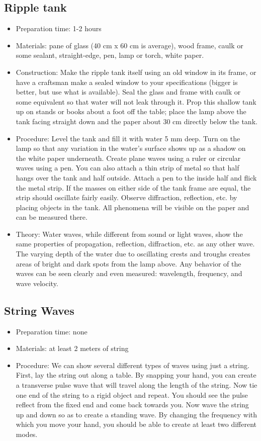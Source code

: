 \subsection{Ripple tank}
\begin{itemize}
\item{Preparation time: 1-2 hours}
\item{Materials: pane of glass (40 cm x 60 cm is average), wood frame, caulk or some sealant, straight-edge, pen, lamp or torch, white paper.}
\item{Construction: Make the ripple tank itself using an old window in its frame, or have a craftsman make a sealed window to your specifications (bigger is better, but use what is available). Seal the glass and frame with caulk or some equivalent so that water will not leak through it. Prop this shallow tank up on stands or books about a foot off the table; place the lamp above the tank facing straight down and the paper about 30 cm directly below the tank.}
\item{Procedure: Level the tank and fill it with water 5 mm deep. Turn on the lamp so that any variation in the water’s surface shows up as a shadow on the white paper underneath. Create plane waves using a ruler or circular waves using a pen. You can also attach a thin strip of metal so that half hangs over the tank and half outside. Attach a pen to the inside half and flick the metal strip. If the masses on either side of the tank frame are equal, the strip should oscillate fairly easily. Observe diffraction, reflection, etc. by placing objects in the tank. All phenomena will be visible on the paper and can be measured there.}
\item{Theory: Water waves, while different from sound or light waves, show the same properties of propagation, reflection, diffraction, etc. as any other wave. The varying depth of the water due to oscillating crests and troughs creates areas of bright and dark spots from the lamp above. Any behavior of the waves can be seen clearly and even measured: wavelength, frequency, and wave velocity.}
\end{itemize}

\subsection{String Waves}
\begin{itemize}
\item{Preparation time: none}
\item{Materials: at least 2 meters of string}
\item{Procedure: We can show several different types of waves using just a string. First, lay the string out along a table. By snapping your hand, you can create a transverse pulse wave that will travel along the length of the string. Now tie one end of the string to a rigid object and repeat. You should see the pulse reflect from the fixed end and come back towards you. Now wave the string up and down so as to create a standing wave. By changing the frequency with which you move your hand, you should be able to create at least two different modes.}
\end{itemize}

